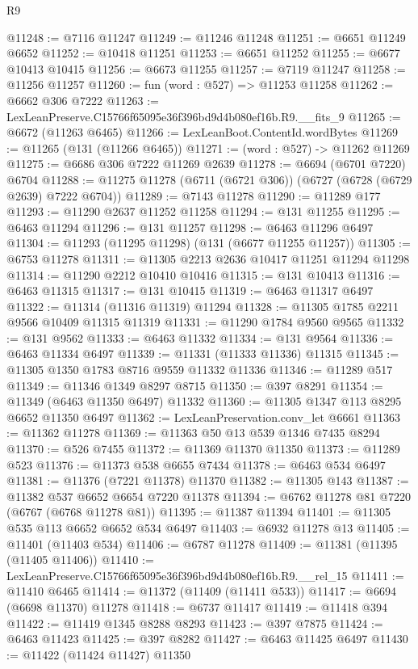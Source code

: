 \begin{lexlean}{R9}
\begin{coremodule}
@11248 := @7116 @11247
@11249 := @11246 @11248
@11251 := @6651 @11249 @6652
@11252 := @10418 @11251
@11253 := @6651 @11252
@11255 := @6677 @10413 @10415
@11256 := @6673 @11255
@11257 := @7119 @11247
@11258 := @11256 @11257
@11260 := fun (word : @527) => @11253 @11258
@11262 := @6662 @306 @7222
@11263 := LexLeanPreserve.C15766f65095e36f396bd9d4b080ef16b.R9.__fits_9
@11265 := @6672 (@11263 @6465)
@11266 := LexLeanBoot.ContentId.wordBytes
@11269 := @11265 (@131 (@11266 @6465))
@11271 := (word : @527) -> @11262 @11269
@11275 := @6686 @306 @7222 @11269 @2639
@11278 := @6694 (@6701 @7220) @6704
@11288 := @11275 @11278 (@6711 (@6721 @306)) (@6727 (@6728 (@6729 @2639) @7222 @6704))
@11289 := @7143 @11278
@11290 := @11289 @177
@11293 := @11290 @2637 @11252 @11258
@11294 := @131 @11255
@11295 := @6463 @11294
@11296 := @131 @11257
@11298 := @6463 @11296 @6497
@11304 := @11293 (@11295 @11298) (@131 (@6677 @11255 @11257))
@11305 := @6753 @11278
@11311 := @11305 @2213 @2636 @10417 @11251 @11294 @11298
@11314 := @11290 @2212 @10410 @10416
@11315 := @131 @10413
@11316 := @6463 @11315
@11317 := @131 @10415
@11319 := @6463 @11317 @6497
@11322 := @11314 (@11316 @11319) @11294
@11328 := @11305 @1785 @2211 @9566 @10409 @11315 @11319
@11331 := @11290 @1784 @9560 @9565
@11332 := @131 @9562
@11333 := @6463 @11332
@11334 := @131 @9564
@11336 := @6463 @11334 @6497
@11339 := @11331 (@11333 @11336) @11315
@11345 := @11305 @1350 @1783 @8716 @9559 @11332 @11336
@11346 := @11289 @517
@11349 := @11346 @1349 @8297 @8715
@11350 := @397 @8291
@11354 := @11349 (@6463 @11350 @6497) @11332
@11360 := @11305 @1347 @113 @8295 @6652 @11350 @6497
@11362 := LexLeanPreservation.conv_let @6661
@11363 := @11362 @11278
@11369 := @11363 @50 @13 @539 @1346 @7435 @8294
@11370 := @526 @7455
@11372 := @11369 @11370 @11350
@11373 := @11289 @523
@11376 := @11373 @538 @6655 @7434
@11378 := @6463 @534 @6497
@11381 := @11376 (@7221 @11378) @11370
@11382 := @11305 @143
@11387 := @11382 @537 @6652 @6654 @7220 @11378
@11394 := @6762 @11278 @81 @7220 (@6767 (@6768 @11278 @81))
@11395 := @11387 @11394
@11401 := @11305 @535 @113 @6652 @6652 @534 @6497
@11403 := @6932 @11278 @13
@11405 := @11401 (@11403 @534)
@11406 := @6787 @11278
@11409 := @11381 (@11395 (@11405 @11406))
@11410 := LexLeanPreserve.C15766f65095e36f396bd9d4b080ef16b.R9.__rel_15
@11411 := @11410 @6465
@11414 := @11372 (@11409 (@11411 @533))
@11417 := @6694 (@6698 @11370) @11278
@11418 := @6737 @11417
@11419 := @11418 @394
@11422 := @11419 @1345 @8288 @8293
@11423 := @397 @7875
@11424 := @6463 @11423
@11425 := @397 @8282
@11427 := @6463 @11425 @6497
@11430 := @11422 (@11424 @11427) @11350

\end{coremodule}
\end{lexlean}

